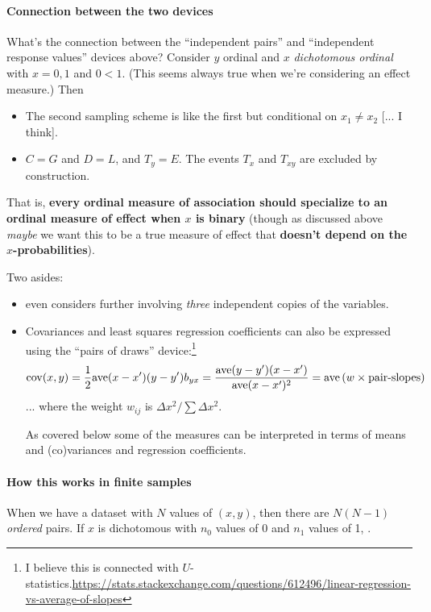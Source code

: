\documentclass[
  11pt,
  fleqn
]{article}
\begin{document}
\paragraph{Connection between the two devices}What's the connection
between the ``independent pairs'' and ``independent response values''
devices above? Consider $y$ ordinal
and $x$ \emph{dichotomous ordinal} with $x = 0, 1$ and $0 < 1$. (This
seems always true when we're considering an effect measure.) Then
\begin{itemize}
  \item The second sampling scheme is like the first but conditional
    on $x_1 \neq x_2$ [... I think].
  \item $C = G$ and $D = L$, and $T_y = E$. The events $T_x$ and
    $T_{xy}$ are excluded by construction.
\end{itemize}
That is, \textbf{every ordinal measure of association should
specialize to an ordinal measure of effect when $x$ is binary}
(though as discussed above \emph{maybe} we want this to be a true measure of
effect that \textbf{doesn't depend on the $x$-probabilities}).

Two asides:

\begin{itemize}
  \item \citet{kruskalOrdinalMeasuresAssociation1958} even
    considers further involving \emph{three} independent copies of
    the variables.
  \item Covariances and least squares regression coefficients can also be
    expressed using the ``pairs of draws'' device:\footnote{ I believe this is
      connected with
      $U$-statistics.\url{https://stats.stackexchange.com/questions/612496/linear-regression-vs-average-of-slopes}
    } \[ \mathrm{cov}(x, y) = \frac{1}{2}\mathrm{ave}(x - x')(y - y') \\ b_{yx} =
      \frac{\mathrm{ave} (y -
      y')(x - x')}{\mathrm{ave} (x - x')^2} = {\mathrm{ave} \left(w \times
      \text{pair-slopes}\right)}
    \]
    ... where the weight $w_{ij}$ is ${\Delta x^2}\big/{\sum \Delta x^2}$.

    As covered below some of the measures can be interpreted in terms
    of means and (co)variances and regression coefficients.
\end{itemize}

\paragraph{How this works in finite samples} When we have a dataset with $N$
values of $(x, y)$, then there are $N(N-1)$ \emph{ordered} pairs. If $x$ is
dichotomous with $n_0$ values of 0 and $n_1$ values of 1, .
\end{document}
